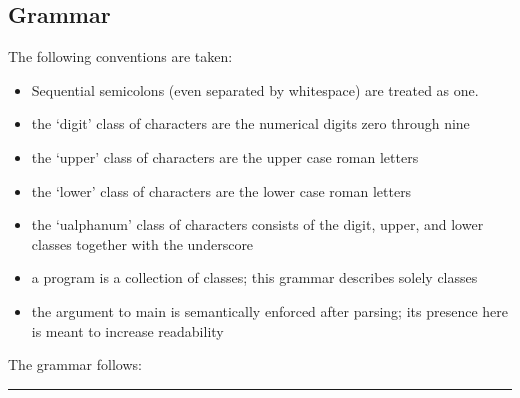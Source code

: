 \newcommand{\comment}[1]{{\escapegrammar$\bullet$\it\ #1}\\}

\subsection{Grammar}

The following conventions are taken:

\begin{itemize}
\item Sequential semicolons (even separated by whitespace) are treated as one.
\item the `digit' class of characters are the numerical digits zero through nine
\item the `upper' class of characters are the upper case roman letters
\item the `lower' class of characters are the lower case roman letters
\item the `ualphanum' class of characters consists of the digit, upper, and lower classes together with the underscore
\item a program is a collection of classes; this grammar describes solely classes
\item the argument to main is semantically enforced after parsing; its presence here is meant to increase readability
\end{itemize}

The grammar follows:\\

\noindent\hrule

